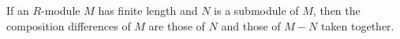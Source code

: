 If an $R$-module $M$ has finite length and $N$ is a submodule of $M$, then the composition differences of $M$ are those of $N$ and those of $M - N$ taken together.
